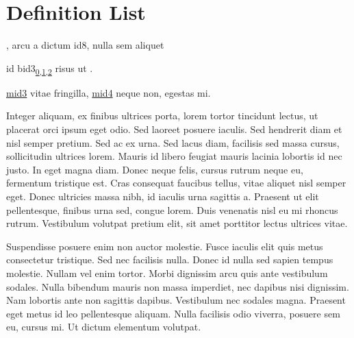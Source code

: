 \documentclass[letterpaper,10pt,english]{sphinxmanual}
\begin{document}
\section{Definition List}
\label{\detokenize{test:definition-list}}\begin{description}
\sphinxAtStartPar
\hyperlink{\detokenize{id7}}{}, arcu a dictum \hypertarget{\detokenize{id8}}{id8}, nulla sem aliquet

\sphinxAtStartPar
id \hypertarget{\detokenize{bid3}}{bid3}\texorpdfstring{\textsubscript{\hyperlink{\detokenize{bid3-ref7}}{0},\hyperlink{\detokenize{bid3-ref17}}{1},\hyperlink{\detokenize{bid3-ref30}}{2}}}{} risus \hyperlink{\detokenize{bid1}}{\hypertarget{\detokenize{bid1-ref20}}{}} ut \hyperlink{\detokenize{bid2}}{\hypertarget{\detokenize{bid2-ref21}}{}}.

\sphinxAtStartPar
\hyperlink{\detokenize{test-mid3-id0}}{\hypertarget{\detokenize{test-mid3-id1}}{mid3}} vitae \hyperlink{\detokenize{bid4}}{\hypertarget{\detokenize{bid4-ref22}}{}} fringilla, \hyperlink{\detokenize{test-mid4-id0}}{\hypertarget{\detokenize{test-mid4-id1}}{mid4}} neque non, egestas mi.

\end{description}

\sphinxAtStartPar
Integer aliquam, ex finibus ultrices porta, lorem tortor tincidunt lectus, ut placerat orci ipsum
eget odio. Sed laoreet posuere iaculis. Sed hendrerit diam et nisl semper pretium. Sed ac ex urna.
Sed lacus diam, facilisis sed massa cursus, sollicitudin ultrices lorem. Mauris id libero feugiat
mauris lacinia lobortis id nec justo. In eget magna diam. Donec neque felis, cursus rutrum neque eu,
fermentum tristique est. Cras consequat faucibus tellus, vitae aliquet nisl semper eget. Donec
ultricies massa nibh, id iaculis urna sagittis a. Praesent ut elit pellentesque, finibus urna sed,
congue lorem. Duis venenatis nisl eu mi rhoncus rutrum. Vestibulum volutpat pretium elit, sit amet
porttitor lectus ultrices vitae.

\sphinxAtStartPar
Suspendisse posuere enim non auctor molestie. Fusce iaculis elit quis metus consectetur tristique.
Sed nec facilisis nulla. Donec id nulla sed sapien tempus molestie. Nullam vel enim tortor. Morbi
dignissim arcu quis ante vestibulum sodales. Nulla bibendum mauris non massa imperdiet, nec dapibus
nisi dignissim. Nam lobortis ante non sagittis dapibus. Vestibulum nec sodales magna. Praesent eget
metus id leo pellentesque aliquam. Nulla facilisis odio viverra, posuere sem eu, cursus mi. Ut
dictum elementum volutpat.
\end{document}
